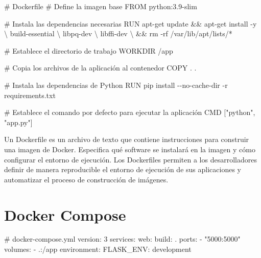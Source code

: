 \documentclass[
  a4paper,
  DIV=11,
  numbers=noendperiod,
  onepage,
  openany]{scrreprt}
\newenvironment{Shaded}{\begin{snugshade}}{\end{snugshade}}
\newcommand{\AttributeTok}[1]{\textcolor[rgb]{0.40,0.45,0.13}{#1}}
\newcommand{\CommentTok}[1]{\textcolor[rgb]{0.37,0.37,0.37}{#1}}
\newcommand{\DataTypeTok}[1]{\textcolor[rgb]{0.68,0.00,0.00}{#1}}
\newcommand{\ExtensionTok}[1]{\textcolor[rgb]{0.00,0.23,0.31}{#1}}
\newcommand{\FunctionTok}[1]{\textcolor[rgb]{0.28,0.35,0.67}{#1}}
\newcommand{\KeywordTok}[1]{\textcolor[rgb]{0.00,0.23,0.31}{#1}}
\newcommand{\NormalTok}[1]{\textcolor[rgb]{0.00,0.23,0.31}{#1}}
\newcommand{\PreprocessorTok}[1]{\textcolor[rgb]{0.68,0.00,0.00}{#1}}
\newcommand{\StringTok}[1]{\textcolor[rgb]{0.13,0.47,0.30}{#1}}
\begin{document}
\begin{Shaded}
\begin{Highlighting}[]
\CommentTok{\# Dockerfile}
\CommentTok{\# Define la imagen base}
\KeywordTok{FROM}\NormalTok{ python:3.9{-}slim}

\CommentTok{\# Instala las dependencias necesarias}
\KeywordTok{RUN} \ExtensionTok{apt{-}get}\NormalTok{ update }\KeywordTok{\&\&} \ExtensionTok{apt{-}get}\NormalTok{ install }\AttributeTok{{-}y} \DataTypeTok{\textbackslash{}}
\NormalTok{    build{-}essential }\DataTypeTok{\textbackslash{}}
\NormalTok{    libpq{-}dev }\DataTypeTok{\textbackslash{}}
\NormalTok{    libffi{-}dev }\DataTypeTok{\textbackslash{}}
    \KeywordTok{\&\&} \FunctionTok{rm} \AttributeTok{{-}rf}\NormalTok{ /var/lib/apt/lists/}\PreprocessorTok{*}

\CommentTok{\# Establece el directorio de trabajo}
\KeywordTok{WORKDIR}\NormalTok{ /app}

\CommentTok{\# Copia los archivos de la aplicación al contenedor}
\KeywordTok{COPY}\NormalTok{ . .}

\CommentTok{\# Instala las dependencias de Python}
\KeywordTok{RUN} \ExtensionTok{pip}\NormalTok{ install }\AttributeTok{{-}{-}no{-}cache{-}dir} \AttributeTok{{-}r}\NormalTok{ requirements.txt}

\CommentTok{\# Establece el comando por defecto para ejecutar la aplicación}
\KeywordTok{CMD}\NormalTok{ [}\StringTok{"python"}\NormalTok{, }\StringTok{"app.py"}\NormalTok{]}
\end{Highlighting}
\end{Shaded}

Un Dockerfile es un archivo de texto que contiene instrucciones para
construir una imagen de Docker. Especifica qué software se instalará en
la imagen y cómo configurar el entorno de ejecución. Los Dockerfiles
permiten a los desarrolladores definir de manera reproducible el entorno
de ejecución de sus aplicaciones y automatizar el proceso de
construcción de imágenes.

\section{Docker Compose 📙}\label{docker-compose}

\begin{Shaded}
\begin{Highlighting}[]
\CommentTok{\# docker{-}compose.yml}
\FunctionTok{version}\KeywordTok{:}\AttributeTok{ }\StringTok{\textquotesingle{}3\textquotesingle{}}
\FunctionTok{services}\KeywordTok{:}
\AttributeTok{  }\FunctionTok{web}\KeywordTok{:}
\AttributeTok{    }\FunctionTok{build}\KeywordTok{:}\AttributeTok{ .}
\AttributeTok{    }\FunctionTok{ports}\KeywordTok{:}
\AttributeTok{      }\KeywordTok{{-}}\AttributeTok{ }\StringTok{"5000:5000"}
\AttributeTok{    }\FunctionTok{volumes}\KeywordTok{:}
\AttributeTok{      }\KeywordTok{{-}}\AttributeTok{ .:/app}
\AttributeTok{    }\FunctionTok{environment}\KeywordTok{:}
\AttributeTok{      }\FunctionTok{FLASK\_ENV}\KeywordTok{:}\AttributeTok{ development}
\end{Highlighting}
\end{Shaded}
\end{document}
